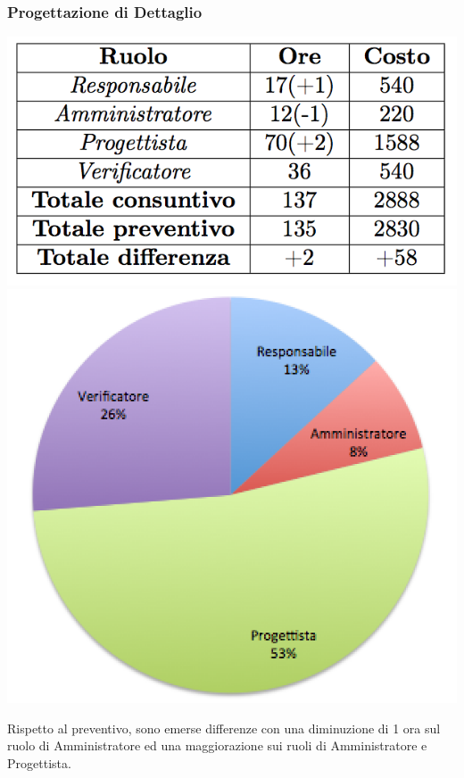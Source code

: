 \begin{frame}
	\frametitle{Progettazione di Dettaglio}
	\begin{center}
		\includegraphics[scale=0.5]{img/prevPD}
		\includegraphics[scale=0.4]{img/cakePD}
	\end{center}
	Rispetto al preventivo, sono emerse differenze con una diminuzione di 1 ora sul ruolo di Amministratore  ed una maggiorazione sui ruoli di  Amministratore e Progettista.
	
\end{frame}